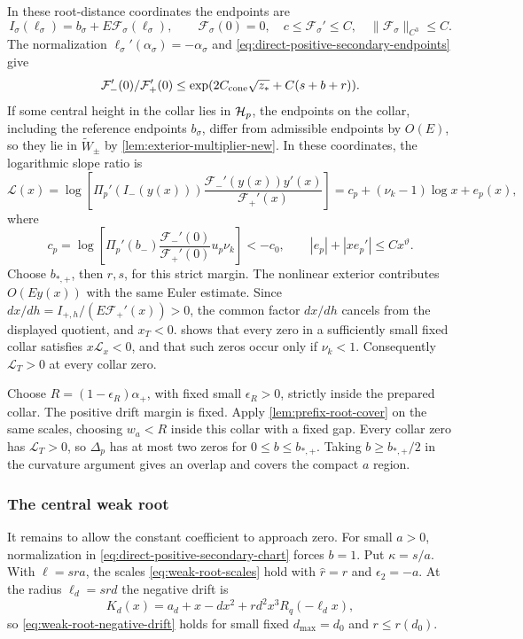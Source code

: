 In these root-distance coordinates the endpoints are
\[
 I_\sigma(\ell_\sigma)=b_\sigma+E\mathcal F_\sigma(\ell_\sigma),\qquad
 \mathcal F_\sigma(0)=0,\quad
 c\le\mathcal F_\sigma'\le C,\quad
 \|\mathcal F_\sigma\|_{C^3}\le C .
\]
The normalization
\(\ell_\sigma'(\alpha_\sigma)=-\alpha_\sigma\) and
\eqref{eq:direct-positive-secondary-endpoints} give
\[
 \mathcal F_-'(0)/\mathcal F_+'(0)
                   \le\exp(2C_{\rm cone}\sqrt{z_*}+C(s+b+r)).
\]
If some central height in the collar lies in \(\mathcal H_p\), the endpoints
on the collar, including the reference endpoints \(b_\sigma\), differ
from admissible endpoints by \(O(E)\), so they lie in \(\widetilde W_\pm\)
by \cref{lem:exterior-multiplier-new}.
In these coordinates, the logarithmic slope ratio is
\[
 \mathcal L(x)
 =\log\left[\Pi_p'(I_-(y(x)))
       \frac{\mathcal F_-'(y(x))y'(x)}{\mathcal F_+'(x)}\right]
 =c_p+(\nu_k-1)\log x+e_p(x),
\]
where
\[
 c_p=\log\left[\Pi_p'(b_-)
        \frac{\mathcal F_-'(0)}{\mathcal F_+'(0)}u_p\nu_k\right]
       <-c_0,\qquad |e_p|+|xe_p'|\le Cx^\vartheta.
\]
Choose \(b_{*,+}\), then \(r,s\), for this strict margin.
The nonlinear exterior contributes \(O(Ey(x))\) with
the same Euler estimate. Since
\(dx/dh=I_{+,h}/(E\mathcal F_+'(x))>0\), the common factor
\(dx/dh\) cancels from the displayed quotient, and \(x_T<0\).
 shows that every zero in a
sufficiently small fixed collar satisfies \(x\mathcal L_x<0\), and that
such zeros occur only if \(\nu_k<1\). Consequently
\(\mathcal L_T>0\) at every collar zero.

Choose \(R=(1-\epsilon_R)\alpha_+\), with fixed small \(\epsilon_R>0\), strictly inside
the prepared collar. The positive drift margin is fixed. Apply
\cref{lem:prefix-root-cover} on the same scales, choosing \(w_a<R\)
inside this collar with a fixed gap. Every collar zero has \(\mathcal L_T>0\), so
\(\Delta_p\) has at most two zeros for \(0\le b\le b_{*,+}\).
Taking \(b\ge b_{*,+}/2\) in the curvature
argument gives an overlap and covers the compact \(a\) region.

\subsubsection{The central weak root}
\label{sec:positive-quadratic-weak-root}

It remains to allow the constant coefficient to approach zero. For
small \(a>0\), normalization in
\eqref{eq:direct-positive-secondary-chart} forces \(b=1\).
Put \(\kappa=s/a\). With \(\ell=sra\), the scales
\eqref{eq:weak-root-scales} hold with \(\hat r=r\) and \(\epsilon_2=-a\).
At the radius \(\ell_d=srd\) the negative drift is
\[
 K_d(x)=a_d+x-dx^2+rd^2x^3R_q(-\ell_dx),
\]
so \eqref{eq:weak-root-negative-drift} holds for small fixed
\(d_{\max}=d_0\) and \(r\le r(d_0)\).

